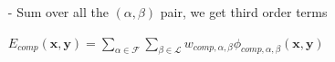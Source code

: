 \documentclass[a0paper,landscape,final]{baposter}
\newcommand{\compresslist}{%
\setlength{\itemsep}{1pt}%
\setlength{\parskip}{0pt}%
\setlength{\parsep}{0pt}%
}
\begin{document}
\begin{poster}
{\begin{itemize}[leftmargin=*, align = left]
\begin{itemize}[leftmargin = 0pt]
            \begin{center}
                $\phi_{comp,\alpha,\beta}(\bm{x},\bm{y}) = \sum_{\bm{p} \in \gamma(\bm{y},\alpha)} \delta(x(\bm{p}) = \beta)$
            \end{center}
        \vspace{-0.1cm}
        \item[-] Sum over all the  $(\alpha, \beta)$ pair, we get third order terms
        \vspace{-0.1cm}
        \begin{center}
        $E_{comp}(\bm{x},\bm{y}) = \sum_{\alpha\in\mathcal{F}} \sum_{\beta\in\mathcal{L}} w_{comp,\alpha,\beta} \phi_{comp,\alpha,\beta}(\bm{x},\bm{y})$
        \end{center}
        \vspace{-0.15cm}
    \end{itemize}
\end{itemize}

%
%
%
%
%
%
%
%
%
  }


\end{poster}
\end{document}
